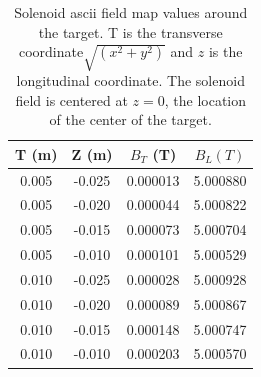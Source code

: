 \begin{table}[h]
	\begin{center}
		\begin{tabular}{| c | c | c | c |}
			\hline \hline
			T (m)  & Z (m) &  $B_T$ (T) & $ B_L (T)$ \\
			\hline
          0.005  &  -0.025 & 0.000013  & 5.000880 \\
          0.005  &  -0.020 & 0.000044  & 5.000822 \\
          0.005  &  -0.015 & 0.000073  & 5.000704 \\
          0.005  &  -0.010 & 0.000101  & 5.000529 \\
          0.010  &  -0.025 & 0.000028  & 5.000928 \\
          0.010  &  -0.020 & 0.000089  & 5.000867 \\
          0.010  &  -0.015 & 0.000148  & 5.000747 \\
          0.010  &  -0.010 & 0.000203  & 5.000570 \\
		\hline \hline
		\end{tabular}
	\end{center}
\caption{Solenoid ascii field map values around the target. T is the transverse coordinate$\sqrt{(x^2+y^2)}$ and $z$ is the longitudinal coordinate.
		 The solenoid field is centered at $z=0$, the location of the center of the target.}\label{tab:solMap}
\end{table}

